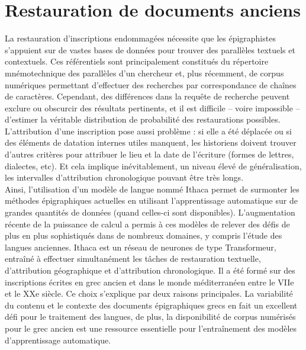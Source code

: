 \documentclass[12pt, twoside]{report}
\begin{document}
\section{Restauration de documents anciens}
\indent La restauration d'inscriptions endommagées nécessite que les épigraphistes s'appuient sur de vastes bases de données pour trouver des parallèles textuels et contextuels. Ces référentiels sont principalement constitués du répertoire mnémotechnique des parallèles d'un chercheur et, plus récemment, de corpus numériques permettant d'effectuer des recherches par \og correspondance de chaînes de caractères\fg. Cependant, des différences dans la requête de recherche peuvent exclure ou obscurcir des résultats pertinents, et il est difficile -- voire impossible -- d'estimer la véritable distribution de probabilité des restaurations possibles. L'attribution d'une inscription pose aussi problème : si elle a été déplacée ou si des éléments de datation internes utiles manquent, les historiens doivent trouver d'autres critères pour attribuer le lieu et la date de l'écriture (formes de lettres, dialectes, etc). Et cela implique inévitablement, un niveau élevé de généralisation, les intervalles d'attribution chronologique pouvant être très longs.\\

Ainsi, l'utilisation d'un modèle de langue nommé Ithaca \autocite{deepmind2022} permet de surmonter les méthodes épigraphiques actuelles en utilisant l'apprentissage automatique sur de grandes quantités de données (quand celles-ci sont disponibles). L'augmentation récente de la puissance de calcul a permis à ces modèles de relever des défis de plus en plus sophistiqués dans de nombreux domaines, y compris l'étude des langues anciennes.
Ithaca est un réseau de neurones de type Transformeur, entraîné à effectuer simultanément les tâches de restauration textuelle, d'attribution géographique et d'attribution chronologique. Il a été formé sur des inscriptions écrites en grec ancien et dans le monde méditerranéen entre le VIIe et le XXe siècle. Ce choix s'explique par deux raisons principales. La variabilité du contenu et le contexte des documents épigraphiques grecs en fait un excellent défi pour le traitement des langues, de plus, la disponibilité de corpus numérisés pour le grec ancien est une ressource essentielle pour l'entraînement des modèles d'apprentissage automatique.\\
\end{document}
